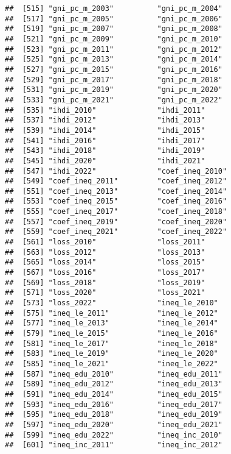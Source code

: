 \documentclass[
]{article}
\begin{document}
\begin{verbatim}
##  [515] "gni_pc_m_2003"          "gni_pc_m_2004"         
##  [517] "gni_pc_m_2005"          "gni_pc_m_2006"         
##  [519] "gni_pc_m_2007"          "gni_pc_m_2008"         
##  [521] "gni_pc_m_2009"          "gni_pc_m_2010"         
##  [523] "gni_pc_m_2011"          "gni_pc_m_2012"         
##  [525] "gni_pc_m_2013"          "gni_pc_m_2014"         
##  [527] "gni_pc_m_2015"          "gni_pc_m_2016"         
##  [529] "gni_pc_m_2017"          "gni_pc_m_2018"         
##  [531] "gni_pc_m_2019"          "gni_pc_m_2020"         
##  [533] "gni_pc_m_2021"          "gni_pc_m_2022"         
##  [535] "ihdi_2010"              "ihdi_2011"             
##  [537] "ihdi_2012"              "ihdi_2013"             
##  [539] "ihdi_2014"              "ihdi_2015"             
##  [541] "ihdi_2016"              "ihdi_2017"             
##  [543] "ihdi_2018"              "ihdi_2019"             
##  [545] "ihdi_2020"              "ihdi_2021"             
##  [547] "ihdi_2022"              "coef_ineq_2010"        
##  [549] "coef_ineq_2011"         "coef_ineq_2012"        
##  [551] "coef_ineq_2013"         "coef_ineq_2014"        
##  [553] "coef_ineq_2015"         "coef_ineq_2016"        
##  [555] "coef_ineq_2017"         "coef_ineq_2018"        
##  [557] "coef_ineq_2019"         "coef_ineq_2020"        
##  [559] "coef_ineq_2021"         "coef_ineq_2022"        
##  [561] "loss_2010"              "loss_2011"             
##  [563] "loss_2012"              "loss_2013"             
##  [565] "loss_2014"              "loss_2015"             
##  [567] "loss_2016"              "loss_2017"             
##  [569] "loss_2018"              "loss_2019"             
##  [571] "loss_2020"              "loss_2021"             
##  [573] "loss_2022"              "ineq_le_2010"          
##  [575] "ineq_le_2011"           "ineq_le_2012"          
##  [577] "ineq_le_2013"           "ineq_le_2014"          
##  [579] "ineq_le_2015"           "ineq_le_2016"          
##  [581] "ineq_le_2017"           "ineq_le_2018"          
##  [583] "ineq_le_2019"           "ineq_le_2020"          
##  [585] "ineq_le_2021"           "ineq_le_2022"          
##  [587] "ineq_edu_2010"          "ineq_edu_2011"         
##  [589] "ineq_edu_2012"          "ineq_edu_2013"         
##  [591] "ineq_edu_2014"          "ineq_edu_2015"         
##  [593] "ineq_edu_2016"          "ineq_edu_2017"         
##  [595] "ineq_edu_2018"          "ineq_edu_2019"         
##  [597] "ineq_edu_2020"          "ineq_edu_2021"         
##  [599] "ineq_edu_2022"          "ineq_inc_2010"         
##  [601] "ineq_inc_2011"          "ineq_inc_2012"         

\end{verbatim}
\end{document}
